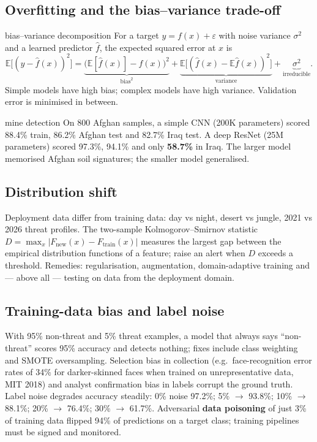 \documentclass[11pt]{article}
\begin{document}
\subsection{Overfitting and the bias--variance trade-off}\label{sec:biasvar}
\begin{derivation}{bias--variance decomposition}
For a target $y=f(x)+\varepsilon$ with noise variance $\sigma^2$ and a learned predictor $\hat f$, the expected squared error at $x$ is
\[\mathbb E\big[(y-\hat f(x))^2\big]=\underbrace{\big(\mathbb E[\hat f(x)]-f(x)\big)^2}_{\text{bias}^2}+\underbrace{\mathbb E\big[(\hat f(x)-\mathbb E\hat f(x))^2\big]}_{\text{variance}}+\underbrace{\sigma^2}_{\text{irreducible}}.\]
Simple models have high bias; complex models have high variance. Validation error is minimised in between.
\end{derivation}
\begin{example}{mine detection}
On 800 Afghan samples, a simple CNN (200K parameters) scored 88.4\% train, 86.2\% Afghan test and 82.7\% Iraq test. A deep ResNet (25M parameters) scored 97.3\%, 94.1\% and only \textbf{58.7\%} in Iraq. The larger model memorised Afghan soil signatures; the smaller model generalised.
\end{example}

\subsection{Distribution shift}\label{sec:shift}
Deployment data differ from training data: day vs night, desert vs jungle, 2021 vs 2026 threat profiles. The two-sample Kolmogorov--Smirnov statistic $D=\max_x|F_{\text{new}}(x)-F_{\text{train}}(x)|$ measures the largest gap between the empirical distribution functions of a feature; raise an alert when $D$ exceeds a threshold. Remedies: regularisation, augmentation, domain-adaptive training and --- above all --- testing on data from the deployment domain.

\subsection{Training-data bias and label noise}
With 95\% non-threat and 5\% threat examples, a model that always says ``non-threat'' scores 95\% accuracy and detects nothing; fixes include class weighting and SMOTE oversampling. Selection bias in collection (e.g.\ face-recognition error rates of 34\% for darker-skinned faces when trained on unrepresentative data, MIT 2018) and analyst confirmation bias in labels corrupt the ground truth. Label noise degrades accuracy steadily: 0\% noise 97.2\%; 5\% $\to$ 93.8\%; 10\% $\to$ 88.1\%; 20\% $\to$ 76.4\%; 30\% $\to$ 61.7\%. Adversarial \textbf{data poisoning} of just 3\% of training data flipped 94\% of predictions on a target class; training pipelines must be signed and monitored.
\end{document}
